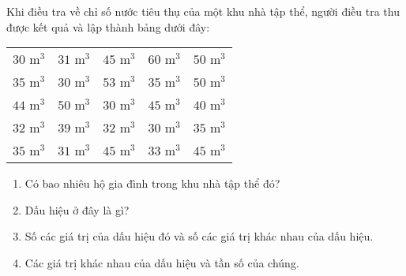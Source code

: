 \begin{bt}%
	Khi điều tra về chỉ số nước tiêu thụ của một khu nhà tập thể, người điều tra thu được kết quả và lập thành bảng dưới đây:
	\begin{center}
		\begin{tabular}{ |c|c|c|c|c|}
		\hline
		$30$ m$^3$ & $31$ m$^3$ &$45$ m$^3$ &$60$ m$^3$ & $50$ m$^3$\\
		$35$ m$^3$ & $30$ m$^3$ &$53$ m$^3$ &$35$ m$^3$ & $50$ m$^3$\\
		$44$ m$^3$ & $50$ m$^3$ &$30$ m$^3$ &$45$ m$^3$ & $40$ m$^3$\\
		$32$ m$^3$ & $39$ m$^3$ &$32$ m$^3$ &$30$ m$^3$ & $35$ m$^3$\\
		$35$ m$^3$ & $31$ m$^3$ &$45$ m$^3$ &$33$ m$^3$ & $45$ m$^3$\\
		\hline
		\end{tabular}
	\end{center}	
	\begin{enumerate}
		\item Có bao nhiêu hộ gia đình trong khu nhà tập thể đó?
		\item Dấu hiệu ở đây là gì?
		\item Số các giá trị của dấu hiệu đó và số các giá trị khác nhau của dấu hiệu.
		\item Các giá trị khác nhau của dấu hiệu và tần số của chúng.
	\end{enumerate}
\end{bt}
